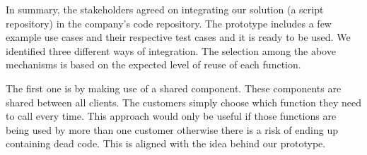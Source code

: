 
In summary, the stakeholders agreed on integrating our solution (a script repository) in the company's code repository. 
%
%
%
The prototype includes a few example use cases and their respective test cases and it is ready to be used. 
%
We identified three different ways of integration. The selection among the above mechanisms is based on the expected level of reuse of each function.

The first one is by making use of a shared component. These components are shared between all clients. The customers simply choose which function they need to call every time. This approach would only be useful if those functions are being used by more than one customer otherwise there is a risk of ending up containing dead code. This is aligned with the idea behind our prototype. 

